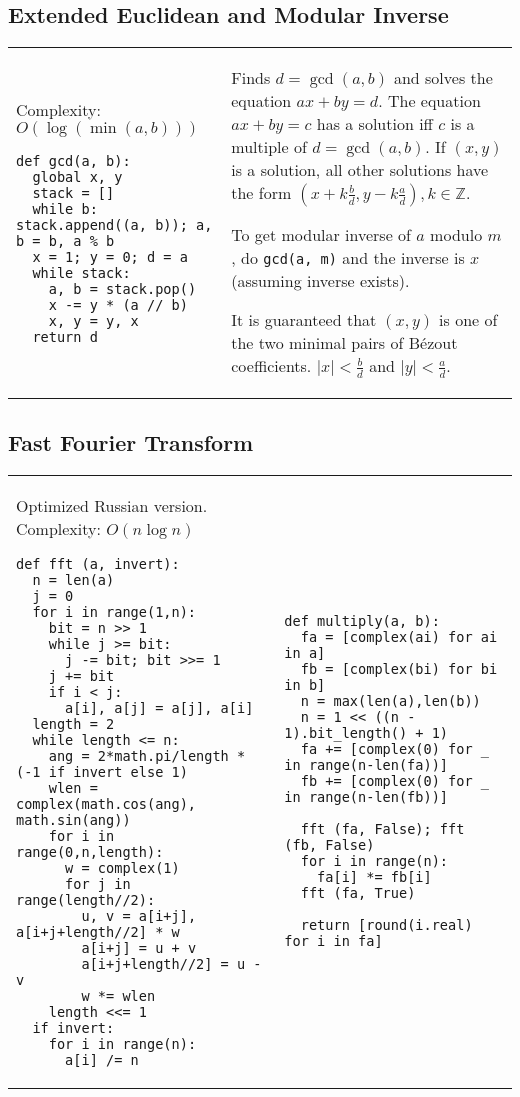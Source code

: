 \documentclass[letterpaper]{article}
\begin{document}
\subsection{Extended Euclidean and Modular Inverse}

\begin{tabular}{@{}p{9cm}p{9cm}@{}}
    Complexity: $O\left(\log\left(\min\left(a,b\right)\right)\right)$

    \begin{lstlisting}
def gcd(a, b):
  global x, y
  stack = []
  while b: stack.append((a, b)); a, b = b, a % b
  x = 1; y = 0; d = a
  while stack:
    a, b = stack.pop()
    x -= y * (a // b)
    x, y = y, x
  return d
\end{lstlisting}
     &
    Finds $d=\gcd(a,b)$ and solves the equation $ax+by=d$. The equation $ax+by=c$ has a solution iff $c$ is a multiple of $d=\gcd(a,b)$. If $(x,y)$ is a solution, all other solutions have the form $(x + k\frac bd, y - k\frac ad), k\in\mathbb Z$.

    To get modular inverse of $a$ modulo $m$, do \texttt{gcd(a, m)} and the inverse is $x$ (assuming inverse exists).

    It is guaranteed that $(x,y)$ is one of the two minimal pairs of B\'ezout coefficients. $|x|<\frac{b}{d}$ and $|y|<\frac{a}{d}$.
\end{tabular}

\subsection{Fast Fourier Transform}
\begin{tabular}{@{}p{10cm}p{8cm}@{}}
    Optimized Russian version. Complexity: $O\left(n\log n\right)$

    \begin{lstlisting}
def fft (a, invert):
  n = len(a)
  j = 0
  for i in range(1,n):
    bit = n >> 1
    while j >= bit:
      j -= bit; bit >>= 1
    j += bit
    if i < j:
      a[i], a[j] = a[j], a[i]
  length = 2
  while length <= n:
    ang = 2*math.pi/length * (-1 if invert else 1)
    wlen = complex(math.cos(ang), math.sin(ang))
    for i in range(0,n,length):
      w = complex(1)
      for j in range(length//2):
        u, v = a[i+j], a[i+j+length//2] * w
        a[i+j] = u + v
        a[i+j+length//2] = u - v
        w *= wlen
    length <<= 1
  if invert:
    for i in range(n):
      a[i] /= n
\end{lstlisting}
     &
    \begin{lstlisting}
def multiply(a, b):
  fa = [complex(ai) for ai in a]
  fb = [complex(bi) for bi in b]
  n = max(len(a),len(b))
  n = 1 << ((n - 1).bit_length() + 1)
  fa += [complex(0) for _ in range(n-len(fa))]
  fb += [complex(0) for _ in range(n-len(fb))]

  fft (fa, False); fft (fb, False)
  for i in range(n):
    fa[i] *= fb[i]
  fft (fa, True)

  return [round(i.real) for i in fa]
\end{lstlisting}
\end{tabular}
\end{document}
